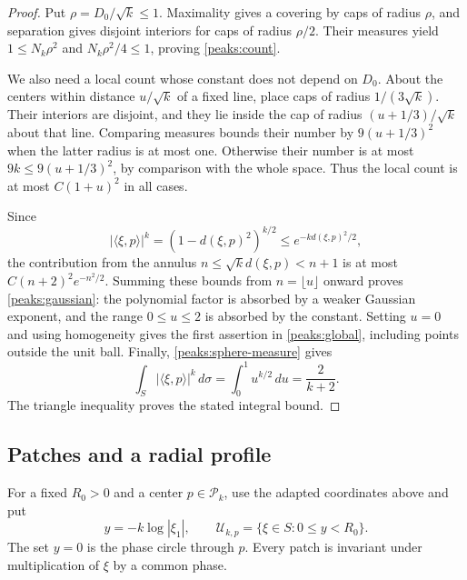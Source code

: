 \begin{proof}
Put $\rho=D_0/\sqrt{k}\le1$.  Maximality gives a covering by caps
of radius $\rho$, and separation gives disjoint interiors for caps
of radius $\rho/2$.  Their measures yield
$1\le N_k\rho^2$ and $N_k\rho^2/4\le1$, proving
\eqref{peaks:count}.

We also need a local count whose constant does not depend on $D_0$.
About the centers within distance $u/\sqrt{k}$ of a fixed line,
place caps of radius $1/(3\sqrt{k})$.  Their interiors are disjoint,
and they lie inside the cap of radius $(u+1/3)/\sqrt{k}$ about that
line.  Comparing measures bounds their number by $9(u+1/3)^2$ when
the latter radius is at most one.  Otherwise their number is at
most $9k\le9(u+1/3)^2$, by comparison with the whole space.
Thus the local count is at most $C(1+u)^2$ in all cases.

Since
\[
 |\langle\xi,p\rangle|^k
 =(1-d(\xi,p)^2)^{k/2}
 \le e^{-kd(\xi,p)^2/2},
\]
the contribution from the annulus
$n\le\sqrt{k}d(\xi,p)<n+1$ is at most
$C(n+2)^2e^{-n^2/2}$.  Summing these bounds from $n=\lfloor u\rfloor$
onward proves \eqref{peaks:gaussian}: the polynomial factor is
absorbed by a weaker Gaussian exponent, and the range $0\le u\le2$
is absorbed by the constant.  Setting $u=0$ and using homogeneity
gives the first assertion in \eqref{peaks:global}, including points
outside the unit ball.  Finally, \eqref{peaks:sphere-measure} gives
\[
 \int_S|\langle\xi,p\rangle|^k\,d\sigma
 =\int_0^1 u^{k/2}\,du=\frac2{k+2}.
\]
The triangle inequality proves the stated integral bound.
\end{proof}

\subsection{Patches and a radial profile}

For a fixed $R_0>0$ and a center $p\in\mathcal P_k$, use the
adapted coordinates above and put
\begin{equation}\label{peaks:patch-definition}
 y=-k\log|\xi_1|,\qquad
 \mathcal U_{k,p}=\{\xi\in S:0\le y<R_0\}.
\end{equation}
The set $y=0$ is the phase circle through $p$.  Every patch is
invariant under multiplication of $\xi$ by a common phase.

